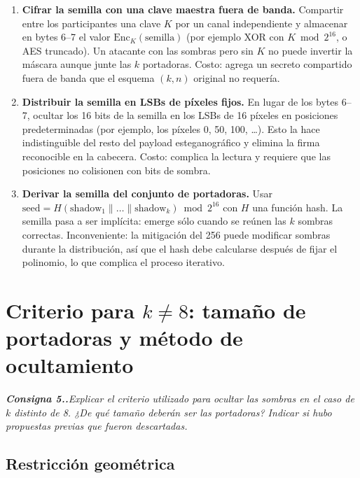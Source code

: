\documentclass[11pt,a4paper]{article}
\newcommand{\pregunta}[1]{%
    \begingroup
    \itshape\small\color{gray!30!black}\textbf{Consigna 5.\arabic{section}.}\enspace #1\par\medskip
    \endgroup
}
\begin{document}
\begin{enumerate}[leftmargin=*]
    \item \textbf{Cifrar la semilla con una clave maestra fuera de banda.}
          Compartir entre los participantes una clave $K$ por un canal
          independiente y almacenar en bytes 6--7 el valor
          $\mathrm{Enc}_K(\text{semilla})$ (por ejemplo XOR con
          $K \bmod 2^{16}$, o AES truncado). Un atacante con las sombras
          pero sin $K$ no puede invertir la máscara aunque junte las $k$
          portadoras. Costo: agrega un secreto compartido fuera de banda
          que el esquema $(k,n)$ original no requería.

    \item \textbf{Distribuir la semilla en LSBs de píxeles fijos.}
          En lugar de los bytes 6--7, ocultar los 16 bits de la semilla en
          los LSBs de 16 píxeles en posiciones predeterminadas (por
          ejemplo, los píxeles 0, 50, 100, \dots). Esto la hace
          indistinguible del resto del payload esteganográfico y elimina
          la firma reconocible en la cabecera. Costo: complica la lectura
          y requiere que las posiciones no colisionen con bits de sombra.

    \item \textbf{Derivar la semilla del conjunto de portadoras.}
          Usar $\mathrm{seed} = H(\text{shadow}_1\|\dots\|\text{shadow}_k)
          \bmod 2^{16}$ con $H$ una función hash. La semilla pasa a ser
          implícita: emerge sólo cuando se reúnen las $k$ sombras
          correctas. Inconveniente: la mitigación del 256 puede modificar
          sombras durante la distribución, así que el hash debe calcularse
          después de fijar el polinomio, lo que complica el proceso
          iterativo.
\end{enumerate}

\section{\texorpdfstring{Criterio para $k \neq 8$: tamaño de portadoras y método de ocultamiento}{Criterio para k != 8: tamano de portadoras y metodo de ocultamiento}}\label{sec:knotsetto8}
\pregunta{Explicar el criterio utilizado para ocultar las sombras en el
caso de $k$ distinto de 8. ¿De qué tamaño deberán ser las portadoras?
Indicar si hubo propuestas previas que fueron descartadas.}

\subsection*{Restricción geométrica}
\end{document}
